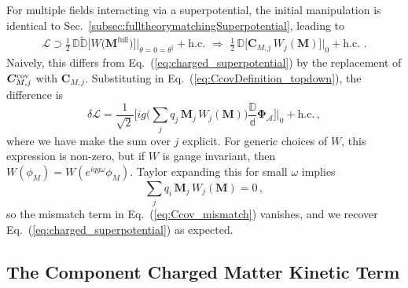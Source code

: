 \documentclass[12pt,document,nofootinbib,superscriptaddress,onecolumn,preprintnumbers,balancelastpage]{article}
\newcommand{\full}{\text{full}}
\newcommand{\PP}{\mathbb{d}}
\DeclareRobustCommand{\Sec}[1]{Sec.~\ref{#1}}
\DeclareRobustCommand{\Eq}[1]{Eq.~(\ref{#1})}
\newcommand{\bM}{ \boldsymbol M}
\newcommand{\bPhiA}{ \boldsymbol{\Phi}_\alc}
\newcommand{\bC}{ \boldsymbol C}
\newcommand{\D}{\mathbb{D}}
\newcommand{\alc}{\mathcal{A}}
\begin{document}
\begin{spacing}{1.2}
For multiple fields interacting via a superpotential, the initial manipulation is identical to \Sec{subsec:fulltheorymatchingSuperpotential}, leading to
%
\begin{align}
\mathcal{L} \supset \frac{1}{2}\, \D \tilde{\D}  \bigg[ W\big(\bM^\full\big) \bigg] \bigg|_{\theta = 0 = \theta^\dagger} + \text{h.c.} \,\, \Longrightarrow \,\, \frac{1}{2}\, \D \bigg[  \bC_{M,j}\, W_j(\bM) \bigg] \bigg|_{0} + \text{h.c.} \, \,.
\end{align}
%
Naively, this differs from \Eq{eq:charged_superpotential} by the replacement of $\bC^{\rm cov}_{M,j}$ with $\bC_{M,j}$. 
%
Substituting in \Eq{eq:CcovDefinition_topdown}, the difference is
%
\begin{equation}
\label{eq:Ccov_mismatch}
\delta \mathcal{L} = \frac{1}{\sqrt{2}} \bigg[ i g \Big(\sum_j q_j \, \bM_j \, W_j(\bM) \Big) \frac{\D}{\PP} \bPhiA \bigg] \bigg|_{0} + \text{h.c.} \,,
\end{equation}
%
where we have make the sum over $j$ explicit.
%
For  generic choices of $W$, this expression is non-zero, but if $W$ is gauge invariant, then  $W(\phi_M) = W(e^{iqg \omega} \phi_M)$.
%
Taylor expanding this for small $\omega$ implies
%
\begin{equation}
\sum_j q_i \, \bM_j \, W_j(\bM) = 0 \,,
\end{equation}
%
so the mismatch term in \Eq{eq:Ccov_mismatch} vanishes, and we recover \Eq{eq:charged_superpotential} as expected.


\subsection{The Component Charged Matter Kinetic Term}



\end{spacing}
\end{document}
